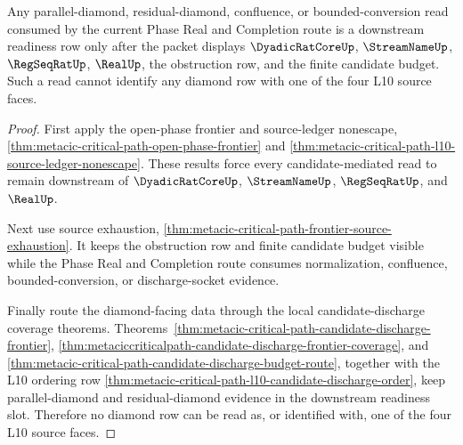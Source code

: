 \begin{theorem}
\label{thm:metacic-parallel-diamond-frontier-seed}
Any parallel-diamond, residual-diamond, confluence, or bounded-conversion read consumed by the current Phase Real and Completion route is a downstream readiness row only after the packet displays $\DyadicRatCoreUp$, $\StreamNameUp$, $\RegSeqRatUp$, $\RealUp$, the obstruction row, and the finite candidate budget. Such a read cannot identify any diamond row with one of the four L10 source faces.
\end{theorem}
\begin{proof}
First apply the open-phase frontier and source-ledger nonescape, \autoref{thm:metacic-critical-path-open-phase-frontier} and \autoref{thm:metacic-critical-path-l10-source-ledger-nonescape}. These results force every candidate-mediated read to remain downstream of $\DyadicRatCoreUp$, $\StreamNameUp$, $\RegSeqRatUp$, and $\RealUp$.

Next use source exhaustion, \autoref{thm:metacic-critical-path-frontier-source-exhaustion}. It keeps the obstruction row and finite candidate budget visible while the Phase Real and Completion route consumes normalization, confluence, bounded-conversion, or discharge-socket evidence.

Finally route the diamond-facing data through the local candidate-discharge coverage theorems. Theorems~\ref{thm:metacic-critical-path-candidate-discharge-frontier}, \ref{thm:metaciccriticalpath-candidate-discharge-frontier-coverage}, and \ref{thm:metacic-critical-path-candidate-discharge-budget-route}, together with the L10 ordering row \autoref{thm:metacic-critical-path-l10-candidate-discharge-order}, keep parallel-diamond and residual-diamond evidence in the downstream readiness slot. Therefore no diamond row can be read as, or identified with, one of the four L10 source faces.
\end{proof}
